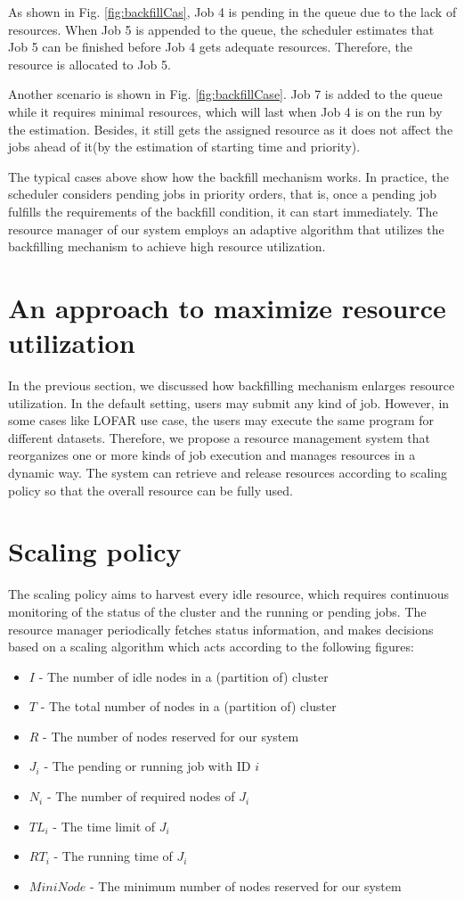 As shown in  Fig. \ref{fig:backfillCas}, Job 4 is pending in the queue due to the lack of resources.
When Job 5 is appended to the queue, the scheduler estimates that Job 5 can be finished before Job 4 gets adequate resources. 
Therefore, the resource is allocated to Job 5.

Another scenario is shown in Fig. \ref{fig:backfillCase}. Job 7 is added to the queue while it requires minimal resources, which will last when Job 4 is on the run by the estimation. 
Besides, it still gets the assigned resource as it does not affect the jobs ahead of it(by the estimation of starting time and priority).

The typical cases above show how the backfill mechanism works. 
In practice, the scheduler considers pending jobs in priority orders, that is, once a pending job fulfills the requirements of the backfill condition, it can start immediately. 
The resource manager of our system employs an adaptive algorithm that utilizes the backfilling mechanism to achieve high resource utilization.

\section{An approach to maximize resource utilization}
In the previous section, we discussed how backfilling mechanism enlarges resource utilization.
In the default setting, users may submit any kind of job. 
However, in some cases like LOFAR use case, the users may execute the same program for different datasets.
Therefore, we propose a resource management system that reorganizes one or more kinds of job execution and manages resources in a dynamic way.
The system can retrieve and release resources according to scaling policy so that the overall resource can be fully used.
\section{Scaling policy}
The scaling policy aims to harvest every idle resource,  which requires continuous monitoring of the status of the cluster and the running or pending jobs. 
The resource manager periodically fetches status information, and makes decisions based on a scaling algorithm which acts according to the following figures:
\begin{itemize}
    \item $I$ - The number of idle nodes in a (partition of) cluster
    \item $T$ - The total number of nodes in a (partition of) cluster
    \item $R$ - The number of nodes reserved for our system
    \item $J_{i}$ - The pending or running job with ID $i$  
    \item $N_{i}$ - The number of required nodes of $J_{i}$
    \item $TL_{i}$ - The time limit of $J_{i}$
    \item $RT_{i}$ - The running time of $J_{i}$
    \item $MiniNode$ - The minimum number of nodes reserved for our system
\end{itemize}

